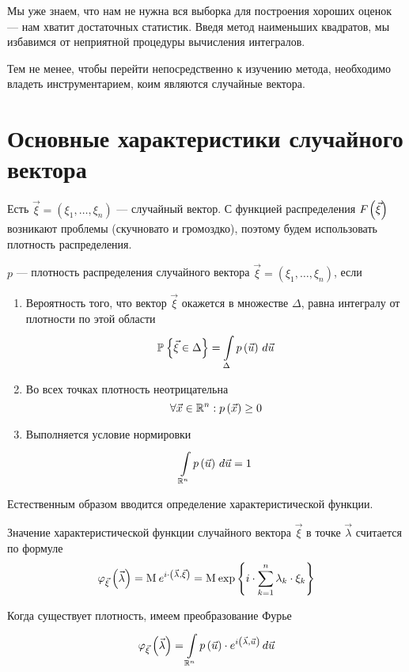 Мы уже знаем, что нам не нужна вся выборка для построения хороших оценок ---
нам хватит достаточных статистик. Введя метод наименьших квадратов,
мы избавимся от неприятной процедуры вычисления интегралов.

Тем не менее, чтобы перейти непосредственно к изучению метода, необходимо
владеть инструментарием, коим являются случайные вектора.

\section{Основные характеристики случайного вектора}

Есть $\vec{\xi} = \left( \xi_1, \dots, \xi_n \right)$ --- случайный вектор.
С функцией распределения $\cdf{\vec{\xi}}$ возникают проблемы (скучновато и
громоздко), поэтому будем использовать плотность распределения.

\begin{definition}
  $p$ --- плотность распределения случайного вектора
  $\vec{\xi} = \left( \xi_1, \dots, \xi_n \right)$, если
  \begin{enumerate}
      \item Вероятность того, что вектор $\vec{\xi}$ окажется
      в множестве $\Delta$, равна интегралу от плотности по этой области
      $$\Probability{\vec{\xi} \in \Delta}
          = \integrall{\Delta}{d\vec{u}}{\pdf{\vec{u}}}$$
      \item Во всех точках плотность неотрицательна
      $$\forall \vec{x} \in \mathbb{R}^n: \pdf{\vec{x}} \ge 0$$
      \item Выполняется условие нормировки
      $$\integrall{\mathbb{R}^n}{d\vec{u}}{\pdf{\vec{u}}} = 1$$
  \end{enumerate}
\end{definition}

Естественным образом вводится определение характеристической функции.

\begin{definition}
  \label{def:characteristicFunction}
  Значение характеристической функции случайного вектора $\vec{\xi}$
  в точке $\vec{\lambda}$ считается по формуле
  $$\varphi_{\vec{\xi}}\left( \vec{\lambda} \right)
      = \mean{e^{i \cdot \left( \vec{\lambda}, \vec{\xi} \right)}}
      = \mean{
      \exp{\left\{ i \cdot \sum_{k=1}^n \lambda_k \cdot \xi_k \right\}}}$$

  Когда существует плотность, имеем преобразование Фурье
  $$\varphi_{\vec{\xi}}\left( \vec{\lambda} \right)
      = \integrall{\mathbb{R}^n}{d\vec{u}}{\pdf{\vec{u}} \cdot
      e^{i \left( \vec{\lambda}, \vec{u} \right)}}$$
\end{definition}

